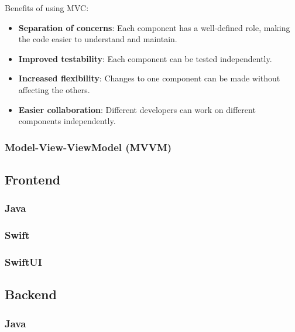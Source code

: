 Benefits of using MVC:

\begin{itemize}
    \item \textbf{Separation of concerns}: Each component has a well-defined role, making the code easier to understand and maintain.
    \item \textbf{Improved testability}: Each component can be tested independently.
    \item \textbf{Increased flexibility}: Changes to one component can be made without affecting the others.
    \item \textbf{Easier collaboration}: Different developers can work on different components independently.
\end{itemize}

\subsubsection{Model-View-ViewModel (MVVM)}



\subsection{Frontend}

\subsubsection{Java}



\subsubsection{Swift}



\subsubsection{SwiftUI}



\subsection{Backend}

\subsubsection{Java}



